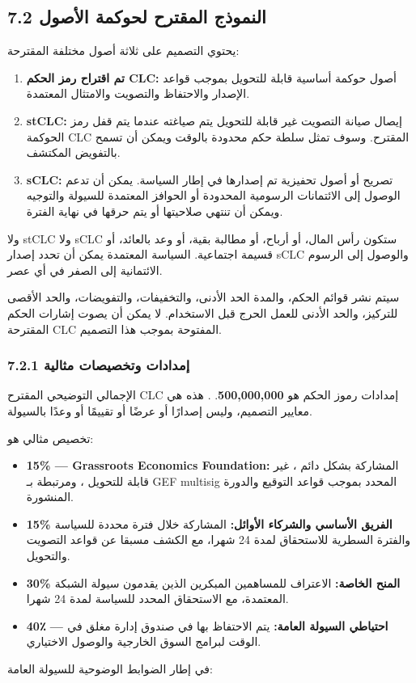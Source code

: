 \documentclass[11pt]{article}
\begin{document}
\subsection*{7.2 النموذج المقترح لحوكمة الأصول}

يحتوي التصميم على ثلاثة أصول مختلفة المقترحة:

\begin{enumerate}[leftmargin=*]
\item \textbf{تم اقتراح رمز الحكم CLC:} أصول حوكمة أساسية قابلة للتحويل بموجب قواعد الإصدار والاحتفاظ والتصويت والامتثال المعتمدة.
\item \textbf{stCLC:} إيصال صيانة التصويت غير قابلة للتحويل يتم صياغته عندما يتم قفل رمز الحوكمة CLC المقترح. وسوف تمثل سلطة حكم محدودة بالوقت ويمكن أن تسمح بالتفويض المكتشف.
\item \textbf{sCLC:} تصريح أو أصول تحفيزية تم إصدارها في إطار السياسة. يمكن أن تدعم الوصول إلى الائتمانات الرسومية المحدودة أو الحوافز المعتمدة للسيولة والتوجيه ويمكن أن تنتهي صلاحيتها أو يتم حرقها في نهاية الفترة.
\end{enumerate}
ولا stCLC ولا sCLC ستكون رأس المال، أو أرباح، أو مطالبة بقية، أو وعد بالعائد، أو قسيمة اجتماعية. السياسة المعتمدة يمكن أن تحدد إصدار sCLC والوصول إلى الرسوم الائتمانية إلى الصفر في أي عصر.

سيتم نشر قوائم الحكم، والمدة الحد الأدنى، والتخفيفات، والتفويضات، والحد الأقصى للتركيز، والحد الأدنى للعمل الحرج قبل الاستخدام. لا يمكن أن يصوت إشارات الحكم المقترحة CLC المفتوحة بموجب هذا التصميم.

\subsubsection*{7.2.1 إمدادات وتخصيصات مثالية}

الإجمالي التوضيحي المقترح CLC إمدادات رموز الحكم هو \textbf{500,000,000}. . هذه هي معايير التصميم، وليس إصدارًا أو عرضًا أو تقييمًا أو وعدًا بالسيولة.

تخصيص مثالي هو:

\begin{itemize}[leftmargin=*]
\item \textbf{15\% --- Grassroots Economics Foundation:} المشاركة بشكل دائم ، غير قابلة للتحويل ، ومرتبطة بـ GEF multisig المحدد بموجب قواعد التوقيع والدورة المنشورة.
\item \textbf{15\%  الفريق الأساسي والشركاء الأوائل:} المشاركة خلال فترة محددة للسياسة والفترة السطرية للاستحقاق لمدة 24 شهرا، مع الكشف مسبقا عن قواعد التصويت والتحويل.
\item \textbf{30\%  المنح الخاصة:} الاعتراف للمساهمين المبكرين الذين يقدمون سيولة الشبكة المعتمدة، مع الاستحقاق المحدد للسياسة لمدة 24 شهرا.
\item \textbf{40٪ --- احتياطي السيولة العامة:} يتم الاحتفاظ بها في صندوق إدارة مغلق في الوقت لبرامج السوق الخارجية والوصول الاختياري.
\end{itemize}
في إطار الضوابط الوضوحية للسيولة العامة:
\end{document}
